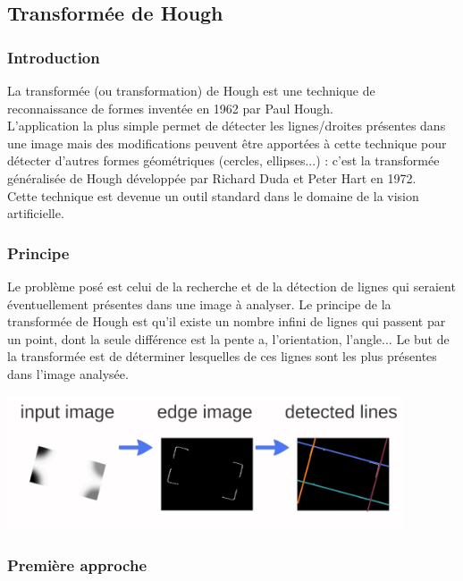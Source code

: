 \subsection{Transform\'ee de Hough}

\subsubsection{Introduction}
La transform\'ee (ou transformation) de Hough est une technique de reconnaissance de formes invent\'ee en 1962 par Paul Hough. \\
L'application la plus simple permet de d\'etecter les lignes/droites pr\'esentes dans une image mais des modifications peuvent \^etre apport\'ees \`a cette technique pour d\'etecter d'autres formes g\'eom\'etriques (cercles, ellipses...) : c'est la transform\'ee g\'en\'eralis\'ee de Hough d\'evelopp\'ee par Richard Duda et Peter Hart en 1972. \\
Cette technique est devenue un outil standard dans le domaine de la vision artificielle.

\subsubsection{Principe}
Le probl\`eme pos\'e est celui de la recherche et de la d\'etection de lignes qui seraient \'eventuellement pr\'esentes dans une image \`a analyser. Le principe de la transform\'ee de Hough est qu'il existe un nombre infini de lignes qui passent par un point, dont la seule diff\'erence est la pente a, l'orientation, l'angle... Le but de la transform\'ee est de d\'eterminer lesquelles de ces lignes sont les plus pr\'esentes dans l'image analys\'ee.
\begin{center}
\includegraphics[height=4cm]{images/hough_1.png}
\end{center}

\subsubsection{Premi\`ere approche}


